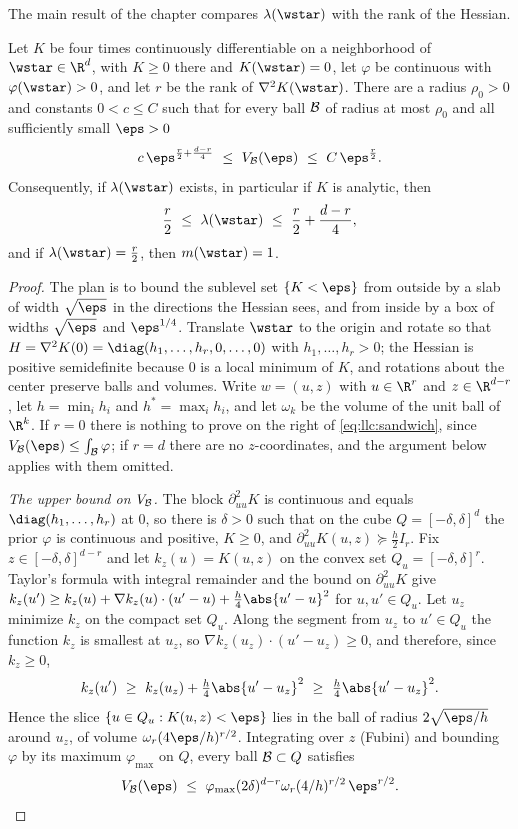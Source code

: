 \begin{refsection}
The main result of the chapter compares $\lambda(\wstar)$ with the rank of the Hessian.

\begin{theorem}\label{thm:llc:hessian}
Let $K$ be four times continuously differentiable on a neighborhood of $\wstar\in\R^d$, with $K\ge0$ there and $K(\wstar)=0$, let $\varphi$ be continuous with $\varphi(\wstar)>0$, and let $r$ be the rank of $\nabla^2K(\wstar)$. There are a radius $\rho_0>0$ and constants $0<c\le C$ such that for every ball $\mathcal{B}$ of radius at most $\rho_0$ and all sufficiently small $\eps>0$
\begin{equation}\label{eq:llc:sandwich}
c\,\eps^{\frac r2+\frac{d-r}4}\ \le\ V_{\llcB}(\eps)\ \le\ C\,\eps^{\frac r2}.
\end{equation}
Consequently, if $\lambda(\wstar)$ exists, in particular if $K$ is analytic, then
\[
\frac r2\ \le\ \lambda(\wstar)\ \le\ \frac r2+\frac{d-r}4,
\]
and if $\lambda(\wstar)=\tfrac r2$, then $m(\wstar)=1$.
\end{theorem}

\begin{proof}
The plan is to bound the sublevel set $\{K<\eps\}$ from outside by a slab of width $\sqrt\eps$ in the directions the Hessian sees, and from inside by a box of widths $\sqrt\eps$ and $\eps^{1/4}$. Translate $\wstar$ to the origin and rotate so that $H=\nabla^2K(0)=\diag(h_1,\dots,h_r,0,\dots,0)$ with $h_1,\dots,h_r>0$; the Hessian is positive semidefinite because $0$ is a local minimum of $K$, and rotations about the center preserve balls and volumes. Write $w=(u,z)$ with $u\in\R^r$ and $z\in\R^{d-r}$, let $h=\min_ih_i$ and $h^*=\max_ih_i$, and let $\omega_k$ be the volume of the unit ball of $\R^k$. If $r=0$ there is nothing to prove on the right of \eqref{eq:llc:sandwich}, since $V_{\llcB}(\eps)\le\int_{\llcB}\varphi$; if $r=d$ there are no $z$-coordinates, and the argument below applies with them omitted.

\emph{The upper bound on $V_{\mathcal{B}}$.} The block $\partial^2_{uu}K$ is continuous and equals $\diag(h_1,\dots,h_r)$ at $0$, so there is $\delta>0$ such that on the cube $Q=[-\delta,\delta]^d$ the prior $\varphi$ is continuous and positive, $K\ge0$, and $\partial^2_{uu}K(u,z)\succeq\tfrac h2I_r$. Fix $z\in[-\delta,\delta]^{d-r}$ and let $k_z(u)=K(u,z)$ on the convex set $Q_u=[-\delta,\delta]^r$. Taylor's formula with integral remainder and the bound on $\partial^2_{uu}K$ give $k_z(u')\ge k_z(u)+\nabla k_z(u)\cdot(u'-u)+\tfrac h4\abs{u'-u}^2$ for $u,u'\in Q_u$. Let $u_z$ minimize $k_z$ on the compact set $Q_u$. Along the segment from $u_z$ to $u'\in Q_u$ the function $k_z$ is smallest at $u_z$, so $\nabla k_z(u_z)\cdot(u'-u_z)\ge0$, and therefore, since $k_z\ge0$,
\[
k_z(u')\ \ge\ k_z(u_z)+\tfrac h4\abs{u'-u_z}^2\ \ge\ \tfrac h4\abs{u'-u_z}^2 .
\]
Hence the slice $\{u\in Q_u:K(u,z)<\eps\}$ lies in the ball of radius $2\sqrt{\eps/h}$ around $u_z$, of volume $\omega_r(4\eps/h)^{r/2}$. Integrating over $z$ (Fubini) and bounding $\varphi$ by its maximum $\varphi_{\max}$ on $Q$, every ball $\mathcal{B}\subset Q$ satisfies
\[
V_{\llcB}(\eps)\ \le\ \varphi_{\max}(2\delta)^{d-r}\omega_r(4/h)^{r/2}\,\eps^{r/2}.
\]


\end{proof}
\end{refsection}
